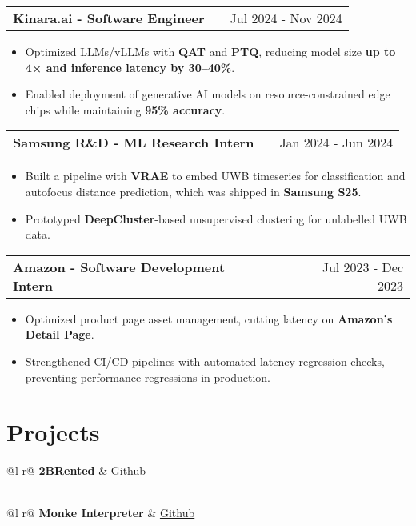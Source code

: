 \documentclass[a4paper,12pt]{article}
\makeatletter
\newenvironment{joblong}[2]
    {
    \begin{tabularx}{\linewidth}{@{}l X r@{}}
    \textbf{#1} & \hfill &  #2 \\[3.75pt]
    \end{tabularx}
    \begin{minipage}[t]{\linewidth}
    \begin{itemize}[nosep, leftmargin=1em, itemsep=1pt,label=--]
    }
    {
    \end{itemize}
    \end{minipage}    
    }
\makeatother
\begin{document}
\begin{joblong}{Kinara.ai - Software Engineer}{Jul 2024 - Nov 2024}
\item Optimized LLMs/vLLMs with \textbf{QAT} and \textbf{PTQ}, reducing model size \textbf{up to 4× and inference latency by 30–40\%}. 
\item Enabled deployment of generative AI models on resource-constrained edge chips while maintaining \textbf{95\% accuracy}.
\end{joblong}

\begin{joblong}{Samsung R\&D - ML Research Intern}{Jan 2024 - Jun 2024}
\item Built a pipeline with \textbf{VRAE} to embed UWB timeseries for classification and autofocus distance prediction, which was shipped in \textbf{Samsung S25}.
\item Prototyped \textbf{DeepCluster}-based unsupervised clustering for unlabelled UWB data.
\end{joblong}

\begin{joblong}{Amazon - Software Development Intern}{Jul 2023 - Dec 2023}
\item Optimized product page asset management, cutting latency on \textbf{Amazon's Detail Page}.
\item Strengthened CI/CD pipelines with automated latency-regression checks, preventing performance regressions in production.
\end{joblong}
\vspace{-2mm}

\section{Projects}

\begin{tabularx}{\linewidth}{ @{}l r@{} }
\textbf{2BRented} & \hfill \href{https://github.com/nameetrajore/2BRented}{Github} \\[3.75pt]
 \\
\end{tabularx}
\vspace{-2mm}

\begin{tabularx}{\linewidth}{ @{}l r@{} }
\textbf{Monke Interpreter} & \hfill \href{https://github.com/nameetrajore/monke-interpreter}{Github} \\[3.75pt]
 \\
\end{tabularx}
\vspace{-2mm}
\end{document}
